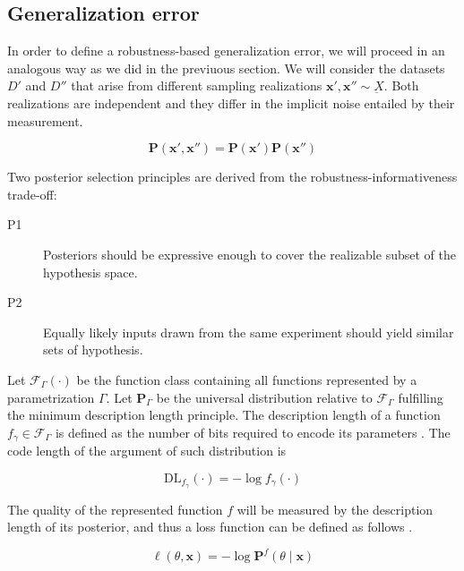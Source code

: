 \subsection{Generalization error}

In order to define a robustness-based generalization error, we will proceed in an
analogous way as we did in the previuous section. We will consider the datasets $D'$ and $D''$
that arise from different sampling realizations $\bm{x}', \bm{x}'' \sim \underbar{X}$. 
Both realizations are independent and they differ in the implicit noise entailed by
their measurement.

$$
    \mathbf{P}(\bm{x}', \bm{x}'') = \mathbf{P}(\bm{x}') \mathbf{P}(\bm{x}'')
$$

Two posterior selection principles are derived from the robustness-informativeness trade-off:
\vspace{-2mm}
\begin{description}
    \item[P1] Posteriors should be expressive enough to cover the realizable subset of the hypothesis space.
    \vspace{-3mm}
    \item[P2] Equally likely inputs drawn from the same experiment should yield similar sets of hypothesis.
\end{description}

\begin{definition}
    Let $\mathcal{F}_{\Gamma}(\cdot)$ be the function class containing all functions 
    represented by a parametrization $\Gamma$. Let $\mathbf{P}_{\Gamma}$ be the
    universal distribution relative to $\mathcal{F}_{\Gamma}$ fulfilling the minimum
    description length principle. The description length of a function $f_\gamma \in \mathcal{F}_{\Gamma}$ 
    is defined as the number of bits required to encode its parameters
    \cite{grunwaldMinimumDescriptionLength2019}.
    The code length of the argument of such distribution is

    $$
    \text{DL}_{f_{\gamma}}(\cdot) = -\log f_{\gamma}(\cdot)
    $$
\end{definition}

The quality of the represented function $f$ will be measured by the description
length of its posterior, and thus a loss function can be defined as follows
\cite{buhmannDataScienceAlgorithms2022}.

$$
    \ell (\theta, \bm{x}) = - \log \mathbf{P}^f (\theta \mid \bm {x})
$$


